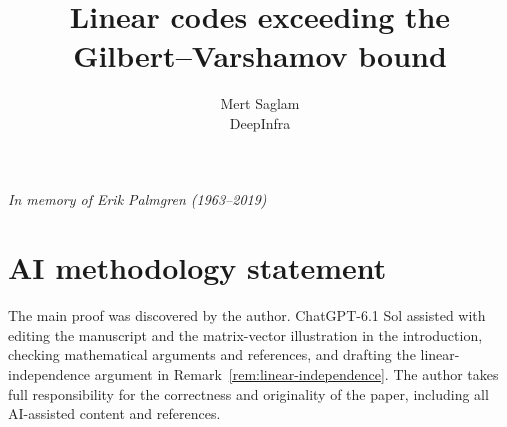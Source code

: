 \documentclass[10pt,letterpaper]{article}
\begin{document}
\title{\vspace{-35px}\bf\fontsize{15}{19}\selectfont
  Linear codes exceeding the Gilbert--Varshamov bound%
  \vspace{-5px}}
\author{\fontsize{10}{12}\selectfont
  Mert Saglam\\[-1pt]
  \fontsize{9}{11}\selectfont DeepInfra}
\date{}
\maketitle
\vspace{-18px}


\vspace{13px}
\noindent\emph{In memory of Erik Palmgren (1963--2019)}
\vspace{-5px}



\printbibliography
\appendix

\section*{AI methodology statement}
The main proof was discovered by the author. ChatGPT-6.1 Sol
assisted with editing the manuscript and the matrix-vector
illustration in the introduction, checking mathematical
arguments and references, and drafting the linear-independence
argument in Remark~\ref{rem:linear-independence}. The author
takes full responsibility for the correctness and originality
of the paper, including all AI-assisted content and references.
\end{document}
